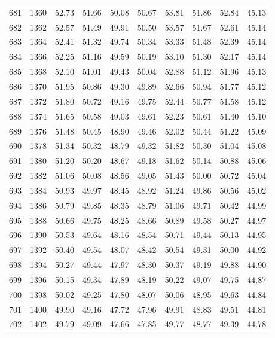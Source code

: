 \begin{longtable}{rrllllllll}
		681 & 1360 & 52.73 & 51.66 & 50.08 & 50.67 & 53.81 & 51.86 & 52.84 & 45.13 \\ 
		682 & 1362 & 52.57 & 51.49 & 49.91 & 50.50 & 53.57 & 51.67 & 52.61 & 45.14 \\ 
		683 & 1364 & 52.41 & 51.32 & 49.74 & 50.34 & 53.33 & 51.48 & 52.39 & 45.14 \\ 
		684 & 1366 & 52.25 & 51.16 & 49.59 & 50.19 & 53.10 & 51.30 & 52.17 & 45.14 \\ 
		685 & 1368 & 52.10 & 51.01 & 49.43 & 50.04 & 52.88 & 51.12 & 51.96 & 45.13 \\ 
		686 & 1370 & 51.95 & 50.86 & 49.30 & 49.89 & 52.66 & 50.94 & 51.77 & 45.12 \\ 
		687 & 1372 & 51.80 & 50.72 & 49.16 & 49.75 & 52.44 & 50.77 & 51.58 & 45.12 \\ 
		688 & 1374 & 51.65 & 50.58 & 49.03 & 49.61 & 52.23 & 50.61 & 51.40 & 45.10 \\ 
		689 & 1376 & 51.48 & 50.45 & 48.90 & 49.46 & 52.02 & 50.44 & 51.22 & 45.09 \\ 
		690 & 1378 & 51.34 & 50.32 & 48.79 & 49.32 & 51.82 & 50.30 & 51.04 & 45.08 \\ 
		691 & 1380 & 51.20 & 50.20 & 48.67 & 49.18 & 51.62 & 50.14 & 50.88 & 45.06 \\ 
		692 & 1382 & 51.06 & 50.08 & 48.56 & 49.05 & 51.43 & 50.00 & 50.72 & 45.04 \\ 
		693 & 1384 & 50.93 & 49.97 & 48.45 & 48.92 & 51.24 & 49.86 & 50.56 & 45.02 \\ 
		694 & 1386 & 50.79 & 49.85 & 48.35 & 48.79 & 51.06 & 49.71 & 50.42 & 44.99 \\ 
		695 & 1388 & 50.66 & 49.75 & 48.25 & 48.66 & 50.89 & 49.58 & 50.27 & 44.97 \\ 
		696 & 1390 & 50.53 & 49.64 & 48.16 & 48.54 & 50.71 & 49.44 & 50.13 & 44.95 \\ 
		697 & 1392 & 50.40 & 49.54 & 48.07 & 48.42 & 50.54 & 49.31 & 50.00 & 44.92 \\ 
		698 & 1394 & 50.27 & 49.44 & 47.97 & 48.30 & 50.37 & 49.19 & 49.88 & 44.90 \\ 
		699 & 1396 & 50.15 & 49.34 & 47.89 & 48.19 & 50.22 & 49.07 & 49.75 & 44.87 \\ 
		700 & 1398 & 50.02 & 49.25 & 47.80 & 48.07 & 50.06 & 48.95 & 49.63 & 44.84 \\ 
		701 & 1400 & 49.90 & 49.16 & 47.72 & 47.96 & 49.91 & 48.83 & 49.51 & 44.81 \\ 
		702 & 1402 & 49.79 & 49.09 & 47.66 & 47.85 & 49.77 & 48.77 & 49.39 & 44.78 \\ 

\end{longtable}
